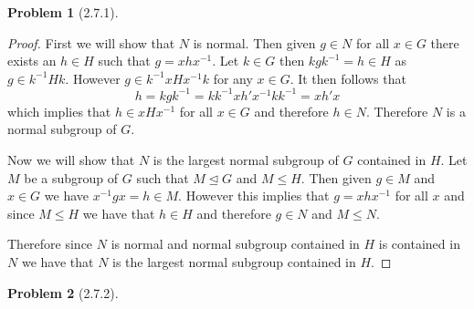 \documentclass[10pt]{article}
\newcommand{\sk}{\vskip 10mm}
\theoremstyle{plain}
\newtheorem{problem}{Problem}
\theoremstyle{remark}
\begin{document}
\begin{problem}[2.7.1]
  
\end{problem}

\begin{proof}
  First we will show that $N$ is normal. Then given $g\in N$ for all $x\in G$ there
  exists an $h\in H$ such that $g=xhx^{-1}$. Let $k\in G$ then $kgk^{-1}=h\in H$ as
  $g\in k^{-1}Hk$. However $g \in k^{-1}xHx^{-1}k$ for any $x\in G$. It then follows that
  \[ h=kgk^{-1}=kk^{-1}xh'x^{-1}kk^{-1}=xh'x\]
  which implies that $h\in xHx^{-1}$ for all $x\in G$ and therefore $h\in N$.
  Therefore $N$ is a normal subgroup of $G$.

  Now we will show that $N$ is the largest normal subgroup of $G$ contained in $H$.
  Let $M$ be a subgroup of $G$ such that $M\trianglelefteq G$ and $M\leq H$. Then
  given $g\in M$ and $x\in G$ we have $x^{-1}gx=h\in M$. However this implies that
  $g=xhx^{-1}$ for all $x$ and since $M\leq H$ we have that $h\in H$ and therefore
  $g\in N$ and $M\leq N$.

  Therefore since $N$ is normal and normal subgroup contained in $H$ is contained
  in $N$ we have that $N$ is the largest normal subgroup contained in $H$.
\end{proof}

\sk

\begin{problem}[2.7.2]
  
\end{problem}
\end{document}
